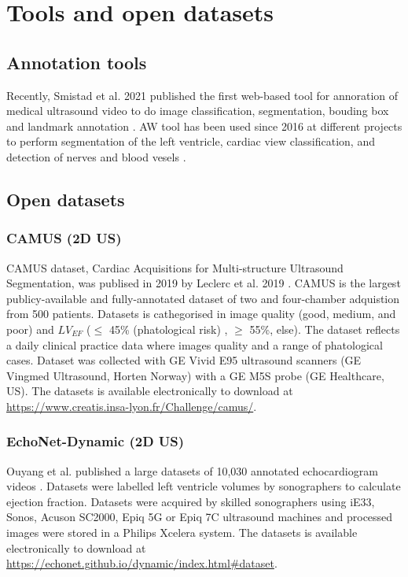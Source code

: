 \section{Tools and open datasets}

\subsection{Annotation tools}
Recently, Smistad et al. 2021 published the first web-based tool for annoration of medical ultrasound video to do image classification, segmentation, bouding box and landmark annotation  \cite{smistad2021-A-IUS}. 
AW tool has been used since 2016 at different projects to perform segmentation of the left ventricle, cardiac view classification, and detection of nerves and blood vesels
\cite{smistad2021-A-IUS}.

\subsection{Open datasets}
\subsubsection{CAMUS (2D US)}
CAMUS dataset, Cardiac Acquisitions for Multi-structure Ultrasound Segmentation, was publised in 2019 by Leclerc et al. 2019 \cite{leclerc2019-IEEETransMedicalImaging}.
CAMUS is the largest publicy-available and fully-annotated dataset of two and four-chamber adquistion from 500 patients.
Datasets is cathegorised in image quality (good, medium, and poor) and $LV_{EF}$ ($\leq$ 45\% (phatological risk) , $\geq$ 55\%, else).
The dataset reflects a daily clinical practice data where images quality and a range of phatological cases.
Dataset was collected with GE Vivid E95 ultrasound scanners (GE Vingmed Ultrasound, Horten Norway) with a GE M5S probe (GE Healthcare, US).
The datasets is available electronically to download at \url{https://www.creatis.insa-lyon.fr/Challenge/camus/}.

\subsubsection{EchoNet-Dynamic (2D US)}
Ouyang et al. published a large datasets of 10,030 annotated echocardiogram videos \cite{ouyang-NeuripsML4H2019, Ouyang-Nature-APR2020}.
Datasets were labelled left ventricle volumes by sonographers to calculate ejection fraction.
Datasets were acquired by skilled sonographers using iE33, Sonos, Acuson SC2000, Epiq 5G or Epiq 7C ultrasound machines and processed images were stored in a Philips Xcelera system.
The datasets is available electronically to download at \url{https://echonet.github.io/dynamic/index.html#dataset}.

